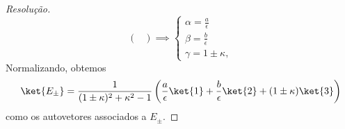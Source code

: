 \begin{proof}[Resolução]
\begin{equation*}
\begin{pmatrix}
        \end{pmatrix} \implies 
        \begin{cases}
            \alpha = \frac{a}{\epsilon}\\
            \beta = \frac{b}{\epsilon}\\
            \gamma = 1 \pm \kappa,
        \end{cases}
    \end{equation*}
    Normalizando, obtemos
    \begin{equation*}
        \ket{E_\pm} = \frac{1}{(1 \pm \kappa)^2 + \kappa^2 - 1}\left(\frac{a}{\epsilon} \ket{1} + \frac{b}{\epsilon} \ket{2} + (1 \pm \kappa) \ket{3}\right)
    \end{equation*}
    como os autovetores associados a \(E_\pm.\)
\end{proof}
